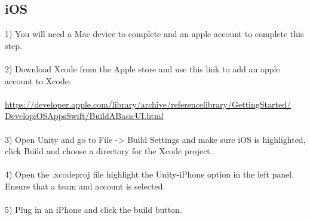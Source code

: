 \documentclass[a4paper]{report}
\begin{document}
\subsection{iOS}
1) You will need a Mac device to complete and an apple account to complete this step.
\\\\
2) Download Xcode from the Apple store and use this link to add an apple account to Xcode:
\\\\
{\url{https://developer.apple.com/library/archive/referencelibrary/GettingStarted/}}
\\
{\url{DevelopiOSAppsSwift/BuildABasicUI.html}}
\\\\
3) Open Unity and go to File -> Build Settings and make sure iOS is highlighted, click Build and choose a directory for the Xcode project.
\\\\
4) Open the .xcodeproj file highlight the Unity-iPhone option in the left panel. Ensure that a team and account is selected.
\\\\
5) Plug in an iPhone and click the build button.
\end{document}
